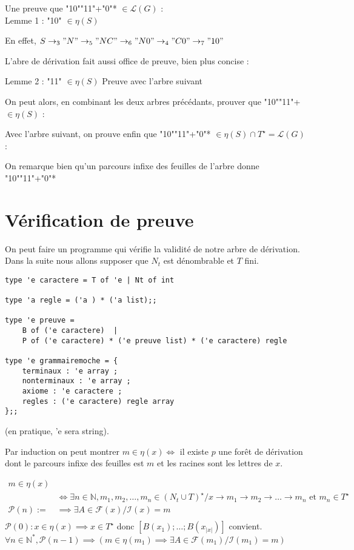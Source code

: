 \documentclass[a4paper,10pt]{article}
\begin{document}
Une preuve que "10""11"+"0"* $\in \mathcal{L}(G)$ :\\
Lemme 1 : "10" $\in \eta(S)$

    En effet, $S\rightarrow_3 "N" \rightarrow_5 "NC" \rightarrow_6 "N0" \rightarrow_4 "C0" \rightarrow_7 "10"$


L'abre de dérivation fait aussi office de preuve, bien plus concise :
   

Lemme 2 : "11" $\in \eta(S)$
Preuve avec l'arbre suivant
 

On peut alors, en combinant les deux arbres précédants, prouver que "10""11"+ $\in \eta(S)$ :
 

Avec l'arbre suivant, on prouve enfin que "10""11"+"0"* $\in \eta(S) \cap T^\star = \mathcal{L}(G)$ :
 

On remarque bien qu'un parcours infixe des feuilles de l'arbre donne "10""11"+"0"*

\section{Vérification de preuve}
On peut faire un programme qui vérifie la validité de notre arbre de dérivation.\\
Dans la suite nous allons supposer que $N_t$ est dénombrable et $T$ fini.

\begin{verbatim}
type 'e caractere = T of 'e | Nt of int

type 'a regle = ('a ) * ('a list);;

type 'e preuve = 
    B of ('e caractere)  |
    P of ('e caractere) * ('e preuve list) * ('e caractere) regle

type 'e grammairemoche = {
    terminaux : 'e array ;
    nonterminaux : 'e array ;
    axiome : 'e caractere ;
    regles : ('e caractere) regle array 
};;
\end{verbatim}

(en pratique, 'e sera string).

Par induction on peut montrer $m \in \eta(x) \iff $ il existe $p$ une forêt de dérivation dont le parcours infixe des feuilles est $m$ et les racines sont les lettres de $x$. 

\begin{align*}
m \in \eta(x)\\
&\iff \exists n \in \mathbb{N}, m_1,m_2,\dots,m_n \in (N_t \cup T)^\star / x \rightarrow m_1 \rightarrow m_2 \rightarrow \dots \rightarrow m_n\text{ et }m_n \in T^\star\\
\mathcal{P}(n) := &\implies \exists A \in \mathcal{F}(x) / \mathcal{I}(x) = m\\
\end{align*}
$\mathcal{P}(0) : x \in \eta(x) \implies x \in T^\star$ donc $[B (x_1);\dots;B (x_{|x|})]$ convient.\\
$\forall n \in \mathbb{N}^*,\mathcal{P}(n-1) \implies (m \in \eta(m_1) \implies \exists A \in \mathcal{F}(m_1)/ \mathcal{I}(m_1) = m)$
\end{document}
